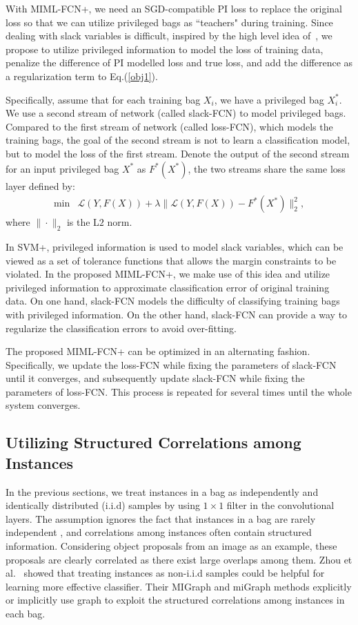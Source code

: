 \documentclass[10pt,twocolumn,letterpaper]{article}
\begin{document}
With \textsc{MIML-FCN+}, we need an SGD-compatible PI loss to
replace the original loss so that we can utilize privileged bags
as ``teachers" during training. Since dealing with slack variables
is difficult, inspired by the high level idea
of~\cite{Vapnik2009}, we propose to utilize privileged information
to model the loss of training data, penalize the difference of PI
modelled loss and true loss, and add the difference as a
regularization term to Eq.(\ref{obj1}).

Specifically, assume that for each training bag $X_i$, we have a
privileged bag $X_i^*$. We use a second stream of network (called
slack-FCN) to model privileged bags. Compared to the first stream
of network (called loss-FCN), which models the training bags, the
goal of the second stream is not to learn a classification model,
but to model the loss of the first stream. Denote the output of
the second stream for an input privileged bag $X^*$ as $F^*(X^*)$,
the two streams share the same loss layer defined by:
\begin{equation}
\label{2fcn-obj}
\begin{matrix}
\min & \mathcal{L}(Y, F(X)) + \lambda\|\mathcal{L}(Y, F(X)) -
F^*(X^*)\|_2^2,
\end{matrix}
\end{equation}
where $\|\cdot\|_2$ is the L$2$ norm.

In SVM+, privileged information is used to model slack variables,
which can be viewed as a set of tolerance functions that allows
the margin constraints to be violated. In the proposed
\textsc{MIML-FCN+}, we make use of this idea and utilize
privileged information to approximate classification error of
original training data. On one hand, slack-FCN models the
difficulty of classifying training bags with privileged
information. On the other hand, slack-FCN can provide a way to
regularize the classification errors to avoid over-fitting.

The proposed \textsc{MIML-FCN+} can be optimized in an alternating
fashion. Specifically, we update the loss-FCN while fixing the
parameters of slack-FCN until it converges, and subsequently
update slack-FCN while fixing the parameters of loss-FCN. This
process is repeated for several times until the whole system
converges.

\subsection{Utilizing Structured Correlations among Instances}
\label{graph} In the previous sections, we treat instances in a
bag as independently and identically distributed (i.i.d) samples
by using $1 \times 1$ filter in the convolutional layers. The
assumption ignores the fact that instances in a bag are rarely
independent , and correlations among instances often contain
structured information. Considering object proposals from an image
as an example, these proposals are clearly correlated as there
exist large overlaps among them. Zhou et al.~\cite{Zhou2009}
showed that treating instances as non-i.i.d samples could be
helpful for learning more effective classifier. Their MIGraph and
miGraph methods explicitly or implicitly use graph to exploit the
structured correlations among instances in each bag.
\end{document}
